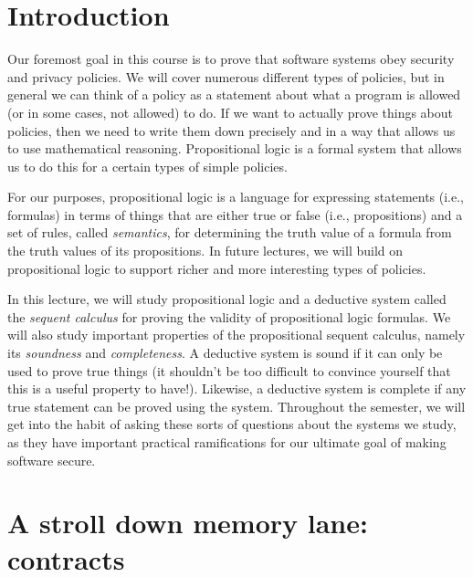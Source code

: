 \documentclass[11pt,twoside]{scrartcl}
\begin{document}
\maketitle
\thispagestyle{empty}


\section{Introduction}

Our foremost goal in this course is to prove that software systems obey security and privacy policies. We will cover numerous different types of policies, but in general we can think of a policy as a statement about what a program is allowed (or in some cases, not allowed) to do. If we want to actually prove things about policies, then we need to write them down precisely and in a way that allows us to use mathematical reasoning. Propositional logic is a formal system that allows us to do this for a certain types of simple policies. 

For our purposes, propositional logic is a language for expressing statements (i.e., formulas) in terms of things that are either true or false (i.e., propositions) and a set of rules, called \emph{semantics}, for determining the truth value of a formula from the truth values of its propositions. In future lectures, we will build on propositional logic to support richer and more interesting types of policies.

In this lecture, we will study propositional logic and a deductive system called the \emph{sequent calculus} for proving the validity of propositional logic formulas. We will also study important properties of the propositional sequent calculus, namely its \emph{soundness} and \emph{completeness}. A deductive system is sound if it can only be used to prove true things (it shouldn't be too difficult to convince yourself that this is a useful property to have!). Likewise, a deductive system is complete if any true statement can be proved using the system. Throughout the semester, we will get into the habit of asking these sorts of questions about the systems we study, as they have important practical ramifications for our ultimate goal of making software secure.

\section{A stroll down memory lane: contracts}
\end{document}
